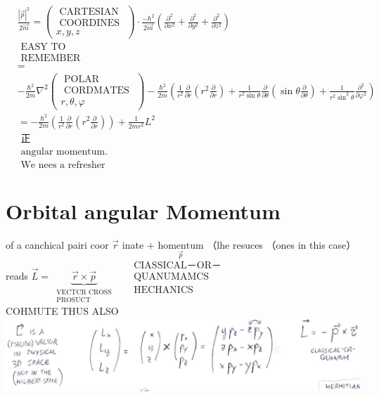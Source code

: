 \documentclass[10pt]{article}
\begin{document}
$$
\begin{aligned}
& \frac{|\vec{p}|^{2}}{2 \vec{m}}=\left(\begin{array}{c}
\text { CARTESIAN } \\
\text { COORDINES } \\
x, y, z
\end{array}\right) \cdot \frac{-\hbar^{2}}{2 \vec{m}}\left(\frac{\partial^{2}}{\partial x^{2}}+\frac{\partial^{2}}{\partial y^{2}}+\frac{\partial^{2}}{\partial z^{2}}\right) \\
& \text { EASY TO } \\
& \text { REMEMBER } \\
& = \\
& -\frac{\hbar^{2}}{2 m} \nabla^{2}\left(\begin{array}{c}
\text { POLAR } \\
\text { CORDMATES } \\
r, \theta, \varphi
\end{array}\right)-\frac{\hbar^{2}}{2 m}\left(\frac{1}{r^{2}} \frac{\partial}{\partial r}\left(r^{2} \frac{\partial}{\partial r}\right)+\frac{1}{r^{2} \sin \theta} \frac{\partial}{\partial \theta}\left(\sin \theta \frac{\partial}{\partial \theta}\right)+\frac{1}{r^{2} \sin ^{2} \theta} \frac{\partial^{2}}{\partial \varphi^{2}}\right) \\
& =-\frac{\hbar^{2}}{2 m}\left(\frac{1}{r^{2}} \frac{\partial}{\partial r}\left(r^{2} \frac{\partial}{\partial r}\right)\right)+\frac{1}{2 m r^{2}} L^{2} \\
& \text { 正 } \\
& \text { angular momentum. } \\
& \text { We nees a refresher }
\end{aligned}
$$

\section*{Orbital angular Momentum}
of a canchical pairi coor $\vec{r}$ inate $+\underset{\vec{p}}{\text { homentum }}$（lhe resuces （ones in this case）\\
reads $\vec{L}=\underbrace{\vec{r} \times \vec{p}}_{\substack{\text { VECTCR CROSS } \\ \text { PROSUCT }}} \quad \begin{gathered}\text { CIASSICAL－OR－} \\ \text { QUANUMAMCS } \\ \text { HECHANICS }\end{gathered}$\\
COHMUTE THUS ALSO\\
\includegraphics[max width=\textwidth, center]{2025_10_16_22329e0f50bdd2511b17g-03}
\end{document}
